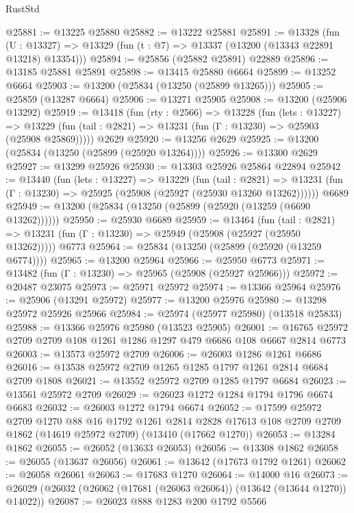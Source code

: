 \begin{lexlean}{RustStd}
\begin{coremodule}
@25881 := @13225 @25880
@25882 := @13222 @25881
@25891 := @13328
    (fun (U : @13327) => @13329 (fun (t : @7) => @13337 (@13200 (@13343 @22891 @13218) @13354)))
@25894 := @25856 (@25882 @25891) @22889
@25896 := @13185 @25881 @25891
@25898 := @13415 @25880 @6664
@25899 := @13252 @6664
@25903 := @13200 (@25834 (@13250 (@25899 @13265)))
@25905 := @25859 (@13287 @6664)
@25906 := @13271 @25905
@25908 := @13200 (@25906 @13292)
@25919 := @13418
    (fun (rty : @2566) =>
    @13228
      (fun (lets : @13227) =>
      @13229 (fun (tail : @2821) => @13231 (fun (Γ : @13230) => @25903 (@25908 @25869)))))
    @2629
@25920 := @13256 @2629
@25925 := @13200 (@25834 (@13250 (@25899 (@25920 @13264))))
@25926 := @13300 @2629
@25927 := @13299 @25926
@25930 := @13303 @25926 @25864 @22894
@25942 := @13440
    (fun (lets : @13227) =>
    @13229
      (fun (tail : @2821) =>
      @13231 (fun (Γ : @13230) => @25925 (@25908 (@25927 (@25930 @13260 @13262))))))
    @6689
@25949 := @13200 (@25834 (@13250 (@25899 (@25920 (@13259 (@6690 @13262))))))
@25950 := @25930 @6689
@25959 := @13464
    (fun (tail : @2821) => @13231 (fun (Γ : @13230) => @25949 (@25908 (@25927 (@25950 @13262)))))
    @6773
@25964 := @25834 (@13250 (@25899 (@25920 (@13259 @6774))))
@25965 := @13200 @25964
@25966 := @25950 @6773
@25971 := @13482 (fun (Γ : @13230) => @25965 (@25908 (@25927 @25966)))
@25972 := @20487 @23075
@25973 := @25971 @25972
@25974 := @13366 @25964
@25976 := @25906 (@13291 @25972)
@25977 := @13200 @25976
@25980 := @13298 @25972 @25926 @25966
@25984 := @25974 (@25977 @25980) (@13518 @25833)
@25988 := @13366 @25976 @25980 (@13523 @25905)
@26001 := @16765 @25972 @2709 @2709 @108 @1261 @1286 @1297 @479 @6686 @108 @6667 @2814 @6773
@26003 := @13573 @25972 @2709
@26006 := @26003 @1286 @1261 @6686
@26016 := @13538 @25972 @2709 @1265 @1285 @1797 @1261 @2814 @6684 @2709 @1808
@26021 := @13552 @25972 @2709 @1285 @1797 @6684
@26023 := @13561 @25972 @2709
@26029 := @26023 @1272 @1284 @1794 @1796 @6674 @6683
@26032 := @26003 @1272 @1794 @6674
@26052 := @17599
    @25972
    @2709
    @1270
    @88
    @16
    @1792
    @1261
    @2814
    @2828
    @17613
    @108
    @2709
    @2709
    @1862
    (@14619 @25972 @2709)
    (@13410 (@17662 @1270))
@26053 := @13284 @1862
@26055 := @26052 (@13633 @26053)
@26056 := @13308 @1862
@26058 := @26055 (@13637 @26056)
@26061 := @13642 (@17673 @1792 @1261)
@26062 := @26058 @26061
@26063 := @17683 @1270
@26064 := @14000 @16
@26073 := @26029 (@26032 (@26062 (@17681 (@26063 @26064)) (@13642 (@13644 @1270)) @14022))
@26087 := @26023
    @888
    @1283
    @200
    @1792
    @5566

\end{coremodule}
\end{lexlean}
